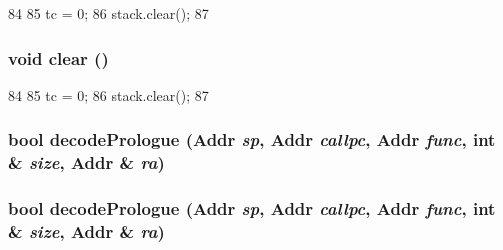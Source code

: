 \begin{DoxyCode}
84     {
85         tc = 0;
86         stack.clear();
87     }
\end{DoxyCode}
\hypertarget{classMipsISA_1_1StackTrace_ac8bb3912a3ce86b15842e79d0b421204}{
\subsubsection[{clear}]{\setlength{\rightskip}{0pt plus 5cm}void clear ()}}
\label{classMipsISA_1_1StackTrace_ac8bb3912a3ce86b15842e79d0b421204}



\begin{DoxyCode}
84     {
85         tc = 0;
86         stack.clear();
87     }
\end{DoxyCode}
\hypertarget{classMipsISA_1_1StackTrace_a875eea16b2891accc8cbec7eb6c36003}{
\subsubsection[{decodePrologue}]{\setlength{\rightskip}{0pt plus 5cm}bool decodePrologue ({\bf Addr} {\em sp}, \/  {\bf Addr} {\em callpc}, \/  {\bf Addr} {\em func}, \/  int \& {\em size}, \/  {\bf Addr} \& {\em ra})}}
\label{classMipsISA_1_1StackTrace_a875eea16b2891accc8cbec7eb6c36003}
\hypertarget{classMipsISA_1_1StackTrace_a875eea16b2891accc8cbec7eb6c36003}{
\subsubsection[{decodePrologue}]{\setlength{\rightskip}{0pt plus 5cm}bool decodePrologue ({\bf Addr} {\em sp}, \/  {\bf Addr} {\em callpc}, \/  {\bf Addr} {\em func}, \/  int \& {\em size}, \/  {\bf Addr} \& {\em ra})}}
\label{classMipsISA_1_1StackTrace_a875eea16b2891accc8cbec7eb6c36003}



